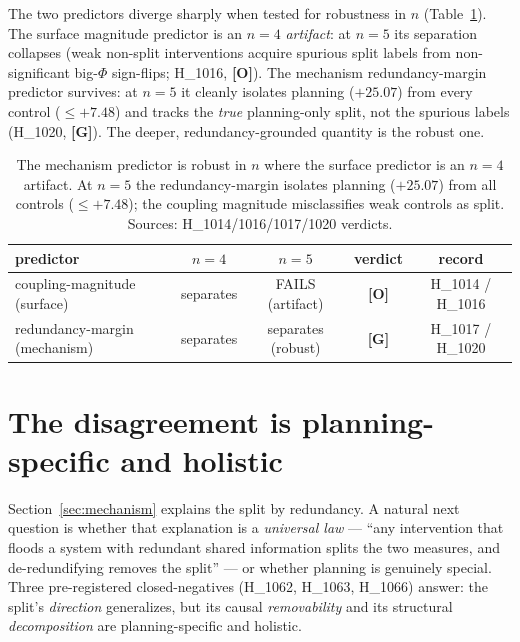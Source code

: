 \documentclass[11pt,a4paper]{article}
\providecommand{\tierGreen}{\textcolor{green!50!black}{\textbf{[G]}}}
\providecommand{\tierOrange}{\textcolor{orange!80!black}{\textbf{[O]}}}
\begin{document}
The two predictors diverge sharply when tested for robustness in $n$
(Table~\ref{tab:predictor}). The surface magnitude predictor is an $n=4$
\emph{artifact}: at $n=5$ its separation collapses (weak non-split interventions
acquire spurious split labels from non-significant big-$\Phi$ sign-flips;
H\_1016, \tierOrange). The mechanism redundancy-margin predictor survives: at
$n=5$ it cleanly isolates planning ($+25.07$) from every control ($\le +7.48$)
and tracks the \emph{true} planning-only split, not the spurious labels (H\_1020,
\tierGreen). The deeper, redundancy-grounded quantity is the robust one.

\begin{table}[h]
\centering
\small
\begin{tabular}{lcccc}
\toprule
\textbf{predictor} & \textbf{$n=4$} & \textbf{$n=5$} & \textbf{verdict} & \textbf{record} \\
\midrule
coupling-magnitude (surface)  & separates & FAILS (artifact)  & \tierOrange & H\_1014 / H\_1016 \\
redundancy-margin (mechanism) & separates & separates (robust) & \tierGreen  & H\_1017 / H\_1020 \\
\bottomrule
\end{tabular}
\caption{The mechanism predictor is robust in $n$ where the surface predictor is
an $n=4$ artifact. At $n=5$ the redundancy-margin isolates planning ($+25.07$)
from all controls ($\le +7.48$); the coupling magnitude misclassifies weak
controls as split. Sources: H\_1014/1016/1017/1020 verdicts.}
\label{tab:predictor}
\end{table}

\section{The disagreement is planning-specific and holistic}
\label{sec:specificity}

Section~\ref{sec:mechanism} explains the split by redundancy. A natural next
question is whether that explanation is a \emph{universal law} --- ``any
intervention that floods a system with redundant shared information splits the
two measures, and de-redundifying removes the split'' --- or whether planning is
genuinely special. Three pre-registered closed-negatives (H\_1062, H\_1063,
H\_1066) answer: the split's \emph{direction} generalizes, but its causal
\emph{removability} and its structural \emph{decomposition} are
planning-specific and holistic.
\end{document}
